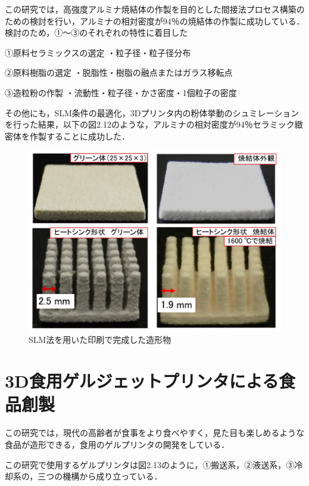 この研究では，高強度アルミナ焼結体の作製を目的とした間接法プロセス構築のための検討を行い，アルミナの相対密度が94％の焼結体の作製に成功している．
検討のため，①～③のそれぞれの特性に着目した

①原料セラミックスの選定
・粒子径・粒子径分布

②原料樹脂の選定
・脱脂性・樹脂の融点またはガラス移転点

③造粒粉の作製
・流動性・粒子径・かさ密度・1個粒子の密度

その他にも，SLM条件の最適化，3Dプリンタ内の粉体挙動のシュミレーションを行った結果，以下の図2.12のような，アルミナの相対密度が94％セラミック緻密体を作製することに成功した．

\begin{figure}[H]
  \centering
  \includegraphics[width=11truecm]{./fig/seramikku.jpg}
  \caption{SLM法を用いた印刷で完成した造形物}
  \label{fig:ferret}
\end{figure}


\section{3D食用ゲルジェットプリンタによる食品創製 \cite{i}}
\label{sec:enum}
この研究では，現代の高齢者が食事をより食べやすく，見た目も楽しめるような食品が造形できる，食用のゲルプリンタの開発をしている．

この研究で使用するゲルプリンタは図2.13のように，①搬送系，②液送系，③冷却系の，三つの機構から成り立っている．

